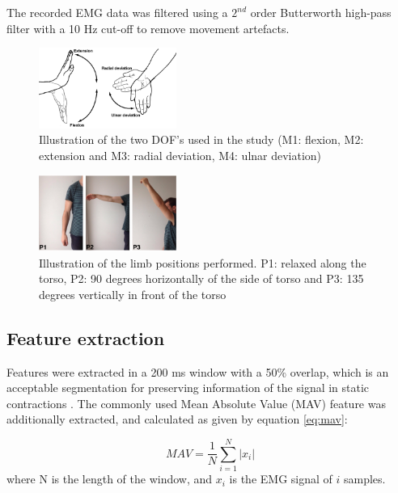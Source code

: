 \begin{multicols}{2}
The recorded EMG data was filtered using a $2^{nd}$ order Butterworth high-pass filter with a 10 Hz cut-off to remove movement artefacts. 

\begin{figure}[H]
	\centering
	\includegraphics[width=0.4\textwidth]{figures/paperFigures/wristmovement}  %
	\caption{Illustration of the two DOF's used in the study (M1: flexion, M2: extension and M3: radial deviation, M4: ulnar deviation)}
	\label{fig:wristmovement}  %
\end{figure}

\begin{figure}[H]
	\centering
	\includegraphics[width=0.4\textwidth]{figures/paperFigures/limb_pos}  %
	\caption{Illustration of the limb positions performed. P1: relaxed along the torso, P2: 90 degrees horizontally of the side of torso and P3: 135 degrees vertically in front of the torso}
	\label{fig:limbpositions}  %
\end{figure}

\subsection*{Feature extraction}
Features were extracted in a 200 ms window with a 50\% overlap, which is an acceptable segmentation for preserving information of the signal in static contractions \cite{Farfan2010}.
The commonly used Mean Absolute Value (MAV) feature was additionally extracted, and calculated as given by equation \ref{eq:mav}: \cite{Zecca2002} 

\begin{equation} \label{eq:mav}
MAV = \frac{1}{N}\sum\limits_{i=1}^N|x_i|
\end{equation}
where N is the length of the window, and $x_i$ is the EMG signal of $i$ samples.


\end{multicols}
